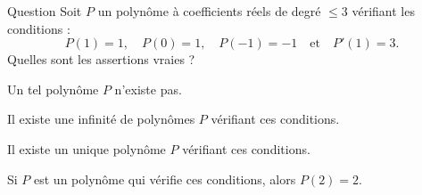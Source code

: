 \begin{multi}[multiple,feedback=
{On pose : \(P(X)=aX^3+bX^2+cX+d\), où \(a,b,c\) et \(d\) sont des réels à déterminer. En résolvant le système :
\[(\mathtt{S})  
\left\{\begin{array}{rcc}
P(1)&=&1\\
P(0)&=&1\\ 
P(-1)&=&-1\\
P'(1)&=&3 \\
\end{array}\right.
\Leftrightarrow  
\left\{\begin{array}{rcc}
a+b+c+d&=&1\\
d&=&1\\ 
-a+b-c+d&=&-1\\
3a+2b+c&=&3. \\
\end{array}\right. \]
On obtient : \(P(X)=2X^3-X^2-X+1\). Par conséquent il existe un unique polynôme vérifiant les conditions ci-dessus et \(P(2)=11\).
}]{Question}
Soit \(P\) un polynôme à coefficients réels de degré \(\le 3\) vérifiant les conditions :
\[P(1)=1,\quad P(0)=1,\quad P(-1)=-1\quad \mbox{et}\quad P'(1)= 3.\]
Quelles sont les assertions vraies ?

    \item Un tel polynôme \(P\) n'existe pas.
    \item Il existe une infinité de polynômes \(P\) vérifiant ces conditions.
    \item* Il existe un unique polynôme \(P\)  vérifiant ces conditions.
    \item Si \(P\) est un polynôme qui vérifie ces conditions, alors \(P(2)=2\).
\end{multi}


